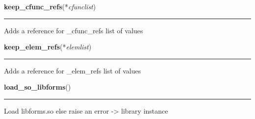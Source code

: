     \label{xformslib:library:keep_cfunc_refs}

    \vspace{0.5ex}

\hspace{.8\funcindent}\begin{boxedminipage}{\funcwidth}

    \raggedright \textbf{keep\_cfunc\_refs}(*\textit{cfunclist})

    \vspace{-1.5ex}

    \rule{\textwidth}{0.5\fboxrule}
\setlength{\parskip}{2ex}

Adds a reference for \_cfunc\_refs list of values
\setlength{\parskip}{1ex}
    \end{boxedminipage}

    \label{xformslib:library:keep_elem_refs}

    \vspace{0.5ex}

\hspace{.8\funcindent}\begin{boxedminipage}{\funcwidth}

    \raggedright \textbf{keep\_elem\_refs}(*\textit{elemlist})

    \vspace{-1.5ex}

    \rule{\textwidth}{0.5\fboxrule}
\setlength{\parskip}{2ex}

Adds a reference for \_elem\_refs list of values
\setlength{\parskip}{1ex}
    \end{boxedminipage}

    \label{xformslib:library:load_so_libforms}

    \vspace{0.5ex}

\hspace{.8\funcindent}\begin{boxedminipage}{\funcwidth}

    \raggedright \textbf{load\_so\_libforms}()

    \vspace{-1.5ex}

    \rule{\textwidth}{0.5\fboxrule}
\setlength{\parskip}{2ex}

Load libforms.so else raise an error -> library instance
\setlength{\parskip}{1ex}
    \end{boxedminipage}

